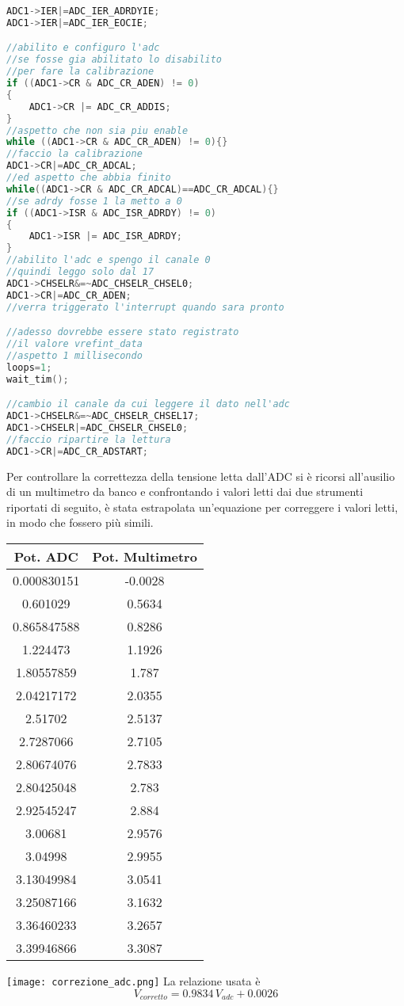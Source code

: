 \documentclass[main.tex]{subfiles}
\begin{document}
\begin{lstlisting}[language=C,caption=Inizializzazione ADC]
ADC1->IER|=ADC_IER_ADRDYIE;
ADC1->IER|=ADC_IER_EOCIE;

//abilito e configuro l'adc
//se fosse gia abilitato lo disabilito
//per fare la calibrazione
if ((ADC1->CR & ADC_CR_ADEN) != 0)
{
	ADC1->CR |= ADC_CR_ADDIS;
}
//aspetto che non sia piu enable
while ((ADC1->CR & ADC_CR_ADEN) != 0){}
//faccio la calibrazione
ADC1->CR|=ADC_CR_ADCAL;
//ed aspetto che abbia finito
while((ADC1->CR & ADC_CR_ADCAL)==ADC_CR_ADCAL){}
//se adrdy fosse 1 la metto a 0
if ((ADC1->ISR & ADC_ISR_ADRDY) != 0)
{
	ADC1->ISR |= ADC_ISR_ADRDY;
}
//abilito l'adc e spengo il canale 0
//quindi leggo solo dal 17
ADC1->CHSELR&=~ADC_CHSELR_CHSEL0;
ADC1->CR|=ADC_CR_ADEN;
//verra triggerato l'interrupt quando sara pronto

//adesso dovrebbe essere stato registrato
//il valore vrefint_data
//aspetto 1 millisecondo
loops=1;
wait_tim();

//cambio il canale da cui leggere il dato nell'adc
ADC1->CHSELR&=~ADC_CHSELR_CHSEL17;
ADC1->CHSELR|=ADC_CHSELR_CHSEL0;
//faccio ripartire la lettura
ADC1->CR|=ADC_CR_ADSTART;
\end{lstlisting}
Per controllare la correttezza della tensione letta dall'ADC si è ricorsi all'ausilio di un multimetro da banco e confrontando i valori letti dai due strumenti riportati di seguito, è stata estrapolata un'equazione per correggere i valori letti, in modo che fossero più simili.


\begin{center}
\begin{tabular}{ | c | c| } 
\hline
Pot. ADC & Pot. Multimetro\\
\hline
0.000830151 & -0.0028 \\
0.601029    & 0.5634  \\
0.865847588 & 0.8286  \\
1.224473    & 1.1926  \\
1.80557859  & 1.787   \\
2.04217172  & 2.0355  \\
2.51702     & 2.5137  \\
2.7287066   & 2.7105  \\
2.80674076  & 2.7833  \\
2.80425048  & 2.783   \\
2.92545247  & 2.884   \\
3.00681     & 2.9576  \\
3.04998     & 2.9955  \\
3.13049984  & 3.0541  \\
3.25087166  & 3.1632  \\
3.36460233  & 3.2657  \\
3.39946866  & 3.3087 \\
\hline
\end{tabular}
\end{center}
\texttt{[image: correzione\_adc.png]}
La relazione usata è 
\begin{equation}
    V_{corretto}=0.9834\,V_{adc}+0.0026
\end{equation}
\end{document}

